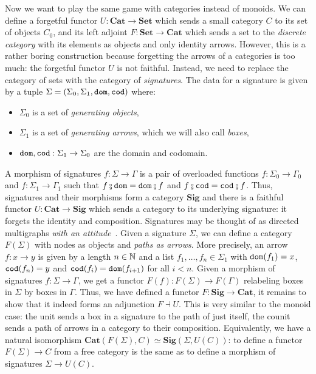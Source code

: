 Now we want to play the same game with categories instead of monoids.
We can define a forgetful functor $U : \mathbf{Cat} \to \mathbf{Set}$ which sends a small category $C$ to its set of objects $C_0$, and its left adjoint $F : \mathbf{Set} \to \mathbf{Cat}$ which sends a set to the \emph{discrete category} with its elements as objects and only identity arrows.
However, this is a rather boring construction because forgetting the arrows of a categories is too much: the forgetful functor $U$ is not faithful.
Instead, we need to replace the category of sets with the category of \emph{signatures}.
The data for a signature is given by a tuple $\Sigma = (\Sigma_0, \Sigma_1, \mathtt{dom}, \mathtt{cod})$ where:
\begin{itemize}
    \item $\Sigma_0$ is a set of \emph{generating objects},
    \item $\Sigma_1$ is a set of \emph{generating arrows}, which we will also call \emph{boxes},
    \item $\mathtt{dom}, \mathtt{cod} : \Sigma_1 \to \Sigma_0$ are the domain and codomain.
\end{itemize}
A morphism of signatures $f : \Sigma \to \Gamma$ is a pair of overloaded functions $f : \Sigma_0 \to \Gamma_0$ and $f : \Sigma_1 \to \Gamma_1$ such that $f \fcmp \dom = \dom \fcmp f$ and $f \fcmp \cod = \cod \fcmp f$.
Thus, signatures and their morphisms form a category $\mathbf{Sig}$ and there is a faithful functor $U : \mathbf{Cat} \to \mathbf{Sig}$ which sends a category to its underlying signature: it forgets the identity and composition.
Signatures may be thought of as directed multigraphs \emph{with an attitude}~\cite{NLab}.
Given a signature $\Sigma$, we can define a category $F(\Sigma)$ with nodes as objects and \emph{paths as arrows}.
More precisely, an arrow $f : x \to y$ is given by a length $n \in \mathbb{N}$ and a list $f_1, \dots, f_n \in \Sigma_1$ with $\mathtt{dom}(f_1) = x$, $\mathtt{cod}(f_n) = y$ and $\mathtt{cod}(f_i) = \mathtt{dom}(f_{i + 1})$ for all $i < n$.
Given a morphism of signatures $f : \Sigma \to \Gamma$, we get a functor $F(f) : F(\Sigma) \to F(\Gamma)$ relabeling boxes in $\Sigma$ by boxes in $\Gamma$.
Thus, we have defined a functor $F : \mathbf{Sig} \to \mathbf{Cat}$, it remains to show that it indeed forms an adjunction $F \dashv U$.
This is very similar to the monoid case: the unit sends a box in a signature to the path of just itself, the counit sends a path of arrows in a category to their composition.
Equivalently, we have a natural isomorphism $\mathbf{Cat}(F(\Sigma), C) \simeq \mathbf{Sig}(\Sigma, U(C))$: to define a functor $F(\Sigma) \to C$ from a free category is the same as to define a morphism of signatures $\Sigma \to U(C)$.

